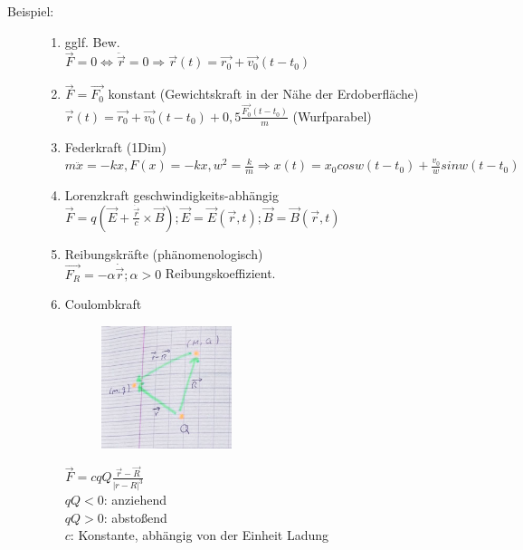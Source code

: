 \begin{description}
\item[Beispiel:]
\begin{enumerate}
\item gglf. Bew. \\
$\vec{F}=0 \Leftrightarrow \ddot{\vec{r}}=0 \Rightarrow \vec{r}(t) = \vec{r_0}+\vec{v_0}(t-t_0)$
\item $\vec{F}=\vec{F_0}$ konstant (Gewichtskraft in der Nähe der Erdoberfläche) \\
$\vec{r}(t)=\vec{r_0}+\vec{v_0}(t-t_0)+0,5 \frac{\vec{F_0}(t-t_0)}{m}$ (Wurfparabel)
\item Federkraft (1Dim) \\
$m\ddot{x}=-kx, F(x)=-kx, w^2=\frac{k}{m}\Rightarrow x(t)=x_0cosw(t-t_0)+\frac{v_0}{w}sinw(t-t_0)$
\item Lorenzkraft geschwindigkeits-abhängig \\
$\vec{F}=q(\vec{E}+\frac{\dot{\vec{r}}}{c}\times\vec{B}); \vec{E}=\vec{E}(\vec{r},t); \vec{B}=\vec{B}(\vec{r},t)$
\item Reibungskräfte (phänomenologisch) \\
$\vec{F_R}=-\alpha\dot{\vec{r}}; \alpha>0$ Reibungskoeffizient.
\item Coulombkraft\\
\begin{figure}[h]
\begin{center}
\includegraphics[width=0.4\textwidth]{Skizzen/Anhang2Kopie.jpg}
\end{center}
\caption{}
\end{figure}
$\vec{F}=cqQ\frac{\vec{r}-\vec{R}}{|r-R|^3}$\\
$qQ<0$: anziehend\\
$qQ>0$: abstoßend\\
$c$: Konstante, abhängig von der Einheit Ladung
\end{enumerate}
\end{description}
